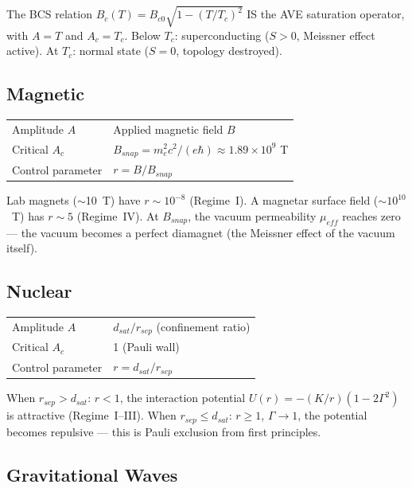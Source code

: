 \noindent The BCS relation $B_c(T) = B_{c0}\sqrt{1 - (T/T_c)^2}$ IS the AVE saturation operator, with $A = T$ and $A_c = T_c$. Below $T_c$: superconducting ($S > 0$, Meissner effect active). At $T_c$: normal state ($S = 0$, topology destroyed).

\subsection{Magnetic}

\begin{center}
\begin{tabular}{ll}
\toprule
Amplitude $A$ & Applied magnetic field $B$ \\
Critical $A_c$ & $B_{snap} = m_e^2 c^2/(e\hbar) \approx 1.89 \times 10^9$ T \\
Control parameter & $r = B / B_{snap}$ \\
\bottomrule
\end{tabular}
\end{center}

\noindent Lab magnets ($\sim$10~T) have $r \sim 10^{-8}$ (Regime~I). A magnetar surface field ($\sim 10^{10}$~T) has $r \sim 5$ (Regime~IV). At $B_{snap}$, the vacuum permeability $\mu_{eff}$ reaches zero --- the vacuum becomes a perfect diamagnet (the Meissner effect of the vacuum itself).

\subsection{Nuclear}

\begin{center}
\begin{tabular}{ll}
\toprule
Amplitude $A$ & $d_{sat}/r_{sep}$ (confinement ratio) \\
Critical $A_c$ & 1 (Pauli wall) \\
Control parameter & $r = d_{sat}/r_{sep}$ \\
\bottomrule
\end{tabular}
\end{center}

\noindent When $r_{sep} > d_{sat}$: $r < 1$, the interaction potential $U(r) = -(K/r)(1 - 2\Gamma^2)$ is attractive (Regime~I--III). When $r_{sep} \leq d_{sat}$: $r \geq 1$, $\Gamma \to 1$\gammaundeclared{}, the potential becomes repulsive --- this is Pauli exclusion from first principles.

\subsection{Gravitational Waves}

